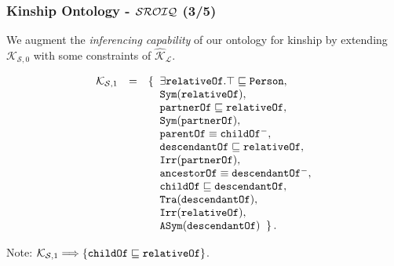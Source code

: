 \documentclass[8pt]{beamer}
\newcommand{\Persons}{\mathtt{Person}}
\newcommand{\relative}{\mathtt{relativeOf}}
\newcommand{\partner}{\mathtt{partnerOf}}
\newcommand{\child}{\mathtt{childOf}}
\newcommand{\parent}{\mathtt{parentOf}}
\newcommand{\ancestor}{\mathtt{ancestorOf}}
\newcommand{\descendant}{\mathtt{descendantOf}}
\newcommand{\KBlcons}{\widehat{\mathcal{K}}_{\mathcal{L}}}
\newcommand{\KBzerozero}{\mathcal{K}_{\mathcal{S},0}}
\newcommand{\KBzeroone}{\mathcal{K}_{\mathcal{S},1}}
\begin{document}
\begin{frame}
\frametitle{Kinship Ontology - $\mathcal{SROIQ}$ (3/5) }

We augment the \emph{inferencing capability} of our ontology for kinship
by extending $\KBzerozero$ with some constraints of $\KBlcons$.

  \begin{small}
  \[  
   \begin{array}{rcl}
    \KBzeroone & = & \{\;\; \exists\relative.\top \Issub \Persons,\\
    &&\phantom{\{\;\;} \issymmetric{\relative},\\
    &&\phantom{\{\;\;} \partner \Issub \relative,\\
    &&\phantom{\{\;\;} \issymmetric{\partner},\\
    &&\phantom{\{\;\;} \parent \equiv \child^{-},\\
    &&\phantom{\{\;\;} \descendant \Issub \relative, \\
    &&\phantom{\{\;\;} \isirreflexive{\partner},\\
    &&\phantom{\{\;\;} \ancestor\equiv\descendant^{-},\\
    &&\phantom{\{\;\;} \child\Issub\descendant, \\
    &&\phantom{\{\;\;} \istransitive{\descendant}, \\
    &&\phantom{\{\;\;} \isirreflexive{\relative},\\
    &&\phantom{\{\;\;} \isantisymmetric{\descendant} \;\;\}\,.
    \end{array}
  \]
  \end{small}

Note:  $\KBzeroone \Longrightarrow \{\child \Issub \relative\}$.
\end{frame}
\end{document}

